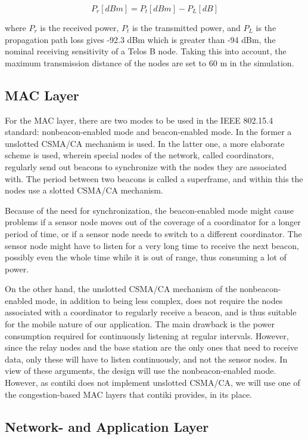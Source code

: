 \documentclass[conference]{IEEEtran}
\begin{document}
\begin{displaymath}
    P_{r}[dBm] = P_{t}[dBm] - P_{L}[dB]
\end{displaymath}

where $P_{r}$ is the received power, $P_{t}$ is the transmitted power, and
$P_{L}$ is the propagation path loss gives -92.3 dBm which is greater than -94
dBm, the nominal receiving sensitivity of a Telos B node. Taking this into
account, the maximum transmission distance of the nodes are set to 60 m in the
simulation.

\subsection{MAC Layer}

For the MAC layer, there are two modes to be used in the IEEE 802.15.4
standard: nonbeacon-enabled mode and beacon-enabled mode. In the former
a unslotted CSMA/CA mechanism is used. In the latter one, a more elaborate
scheme is used, wherein special nodes of the network, called coordinators,
regularly send out beacons to synchronize with the nodes they are associated
with. The period between two beacons is called a superframe, and within this
the nodes use a slotted CSMA/CA mechanism.

Because of the need for synchronization, the beacon-enabled mode might cause
problems if a sensor node moves out of the coverage of a coordinator for
a longer period of time, or if a sensor node needs to switch to a different
coordinator.  The sensor node might have to listen for a very long time to
receive the next beacon, possibly even the whole time while it is out of range,
thus consuming a lot of power.

On the other hand, the unslotted CSMA/CA mechanism of the nonbeacon-enabled
mode, in addition to being less complex, does not require the nodes associated
with a coordinator to regularly receive a beacon, and is thus suitable for the
mobile nature of our application. The main drawback is the power consumption
required for continuously listening at regular intervals.  However, since the
relay nodes and the base station are the only ones that need to receive data,
only these will have to listen continuously, and not the sensor nodes. In view
of these arguments, the design will use the nonbeacon-enabled mode. However, as
contiki does not implement unslotted CSMA/CA, we will use one of the
congestion-based MAC layers that contiki provides, in its place.

\subsection{Network- and Application Layer}
\end{document}
